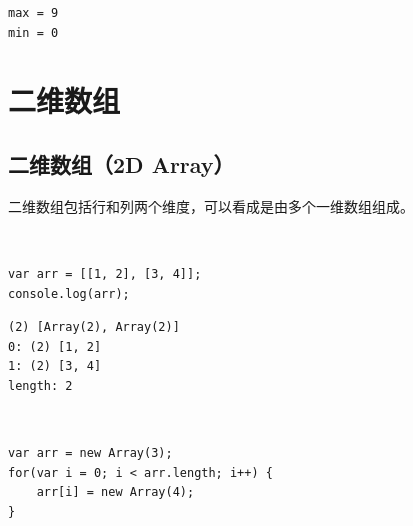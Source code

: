 \begin{tcolorbox}
	\begin{verbatim}
max = 9
min = 0
	\end{verbatim}
\end{tcolorbox}

\newpage

\section{二维数组}

\subsection{二维数组（2D Array）}

二维数组包括行和列两个维度，可以看成是由多个一维数组组成。

\begin{table}[H]
	\centering
\end{table}

\\

\begin{lstlisting}[style=htmlcssjs]
var arr = [[1, 2], [3, 4]];
console.log(arr);
\end{lstlisting}

\begin{tcolorbox}
	\begin{verbatim}
(2) [Array(2), Array(2)]
0: (2) [1, 2]
1: (2) [3, 4]
length: 2
	\end{verbatim}
\end{tcolorbox}

\vspace{0.5cm}

\\

\begin{lstlisting}[style=htmlcssjs]
var arr = new Array(3);
for(var i = 0; i < arr.length; i++) {
    arr[i] = new Array(4);
}
\end{lstlisting}

